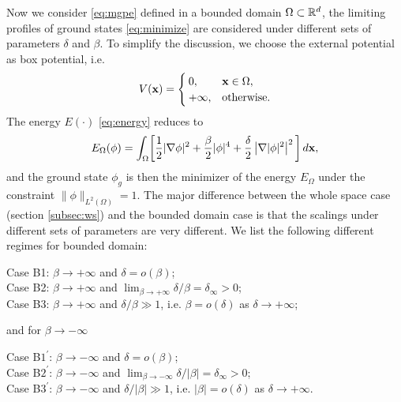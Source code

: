 \documentclass{elsarticle}
\newcommand{\be}{\begin{equation}}
\newcommand{\ee}{\end{equation}}
\newcommand{\bx}{{\bf x} }
\begin{document}
Now we consider \eqref{eq:mgpe} defined in a bounded domain $\Omega\subset\Bbb R^d$,
the limiting profiles of ground states \eqref{eq:minimize} are considered under different sets of parameters $\delta$
and $\beta$. To simplify the discussion, we choose
the external potential as box potential, i.e.
\be\label{eq:boxpt}
V(\bx)=\begin{cases}0,&\bx\in\Omega,\\
+\infty,&\text{otherwise}.\end{cases}
\ee
The energy $E(\cdot)$ \eqref{eq:energy} reduces to
\be\label{eq:energybd}
E_{\Omega}(\phi)=\int_{\Omega}\biggl[
\frac12|\nabla\phi|^2+\frac{\beta}{2}|\phi|^4+\frac{\delta}{2}\left|\nabla|\phi|^2\right|^2\biggl]\,d\bx,
\ee
and the ground state $\phi_g$ is then the minimizer of the energy $E_{\Omega}$ under the constraint $\|\phi\|_{L^2(\Omega)}=1$.
 The major difference between
the whole space case (section \ref{subsec:ws}) and the bounded domain case is that the scalings under different sets of parameters are very different. We list the following different regimes for bounded
domain:

 Case B1: $\beta\to +\infty$ and $\delta=o(\beta)$;\\
 \hspace*{.4cm} Case B2: $\beta\to+\infty$ and $\lim_{\beta\to+\infty}\delta/\beta=\delta_\infty>0$;\\
 \hspace*{.4cm} Case B3: $\beta\to+\infty$ and  $\delta/\beta\gg1$, i.e. $\beta=o(\delta)$ as $\delta\to+\infty$;

\noindent and for $\beta\to-\infty$

 Case B$1^\prime$: $\beta\to -\infty$ and  $\delta=o(\beta)$;\\
 \hspace*{.4cm} Case B$2^\prime$: $\beta\to-\infty$ and $\lim_{\beta\to-\infty}\delta/|\beta|=\delta_\infty>0$;\\
 \hspace*{.4cm} Case B$3^\prime$: $\beta\to-\infty$ and  $\delta/|\beta|\gg1$, i.e. $|\beta|=o(\delta)$ as $\delta\to+\infty$.
\end{document}
